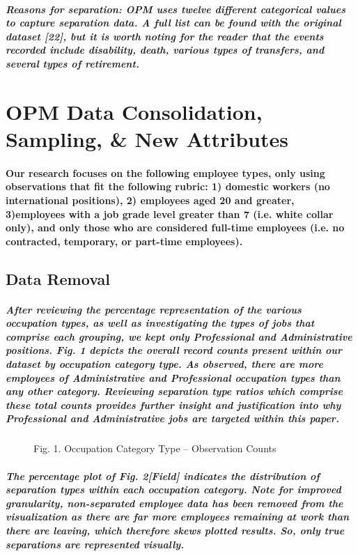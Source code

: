 \documentclass{article}
\begin{document}
\subparagraph{Reasons for separation: OPM uses twelve different categorical values to capture separation data.  A full list can be found with the original dataset [22], but it is worth noting for the reader that the events recorded include disability, death, various types of transfers, and several types of retirement.}

\section{OPM Data Consolidation, Sampling, \& New Attributes}

\paragraph{Our research focuses on the following employee types, only using observations that fit the following rubric: 1) domestic workers (no international positions), 2) employees aged 20 and greater, 3)employees with a job grade level greater than 7 (i.e. white collar only), and only those who are considered full-time employees (i.e. no contracted, temporary, or part-time employees).}  
  
 
\subsection{Data Removal}

\subparagraph{After reviewing the percentage representation of the various occupation types, as well as investigating the types of jobs that comprise each grouping, we kept only Professional and Administrative positions. Fig. 1 depicts the overall record counts present within our dataset by occupation category type. As observed, there are more employees of Administrative and Professional occupation types than any other category. Reviewing separation type ratios which comprise these total counts provides further insight and justification into why Professional and Administrative jobs are targeted within this paper.}
 
 
\begin{figure}
\caption{Fig. 1. Occupation Category Type – Observation Counts}
\end{figure}
 
\subparagraph{The percentage plot of Fig. 2[Field] indicates the distribution of separation types within each occupation category. Note for improved granularity, non-separated employee data has been removed from the visualization as there are far more employees remaining at work than there are leaving, which therefore skews plotted results. So, only true separations are represented visually.}
\end{document}
